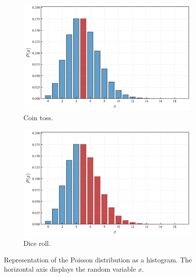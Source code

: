 \documentclass{book}
\begin{document}
\begin{figure}[ht]
    \centering
    \begin{subfigure}[b]{0.48\textwidth}
        \centering
        \includegraphics[width=\textwidth, height=0.7\textwidth]{figures/chapter2/poisson_1.png}
        \caption{Coin toss.}
        \label{fig:poisson1}
    \end{subfigure}
    \hfill
    \begin{subfigure}[b]{0.48\textwidth}
        \centering
        \includegraphics[width=\textwidth, height=0.7\textwidth]{figures/chapter2/poisson_2.png}
        \caption{Dice roll.}
        \label{fig:poisson2}
    \end{subfigure}
    \caption{Representation of the Poisson distribution as a histogram. The horizontal axis displays the random variable $x$.}
    \label{fig:binomial_comparison}
\end{figure}
\end{document}
